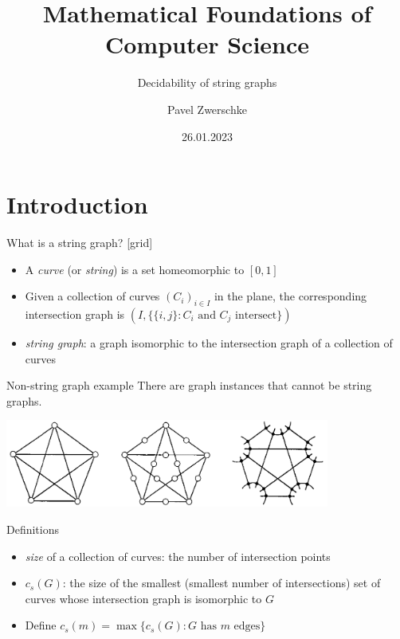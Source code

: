 \documentclass[10pt,aspectratio=169]{beamer}
\title{Mathematical Foundations of Computer Science}
\subtitle{Decidability of string graphs}
\date{26.01.2023}
\author{Pavel Zwerschke}
\institute{Radboud University Nijmegen}
\theoremstyle{plain}
\newcommand{\set}[1]{\{#1\}}
\begin{document}
\maketitle

\section{Introduction}

\begin{frame}{What is a string graph?}
    [grid]
    \begin{itemize}
        \item A \textit{curve} (or \textit{string}) is a set homeomorphic to \([0,1]\)
        \item Given a collection of curves \((C_i)_{i \in I}\) in the plane, the corresponding intersection graph is \( (I, \set{\set{i, j} : C_i \text{ and } C_j \text{ intersect}}) \)
        \item \textit{string graph}: a graph isomorphic to the intersection graph of a collection of curves 
    \end{itemize}
\end{frame}

\begin{frame}{Non-string graph example}
    There are graph instances that cannot be string graphs.

    \begin{center}
        \includegraphics[width=0.8\textwidth]{images/figure-0.png}
    \end{center}
\end{frame}

\begin{frame}{Definitions}
    \begin{itemize}
        \item \textit{size} of a collection of curves: the number of intersection points
        \item \(c_s(G)\): the size of the smallest (smallest number of intersections) set of curves whose intersection graph is isomorphic to \(G\)
        \item Define \(c_s(m) = \max\set{c_s(G) : G \text{ has } m \text{ edges}}\)
    \end{itemize}
\end{frame}
\end{document}
